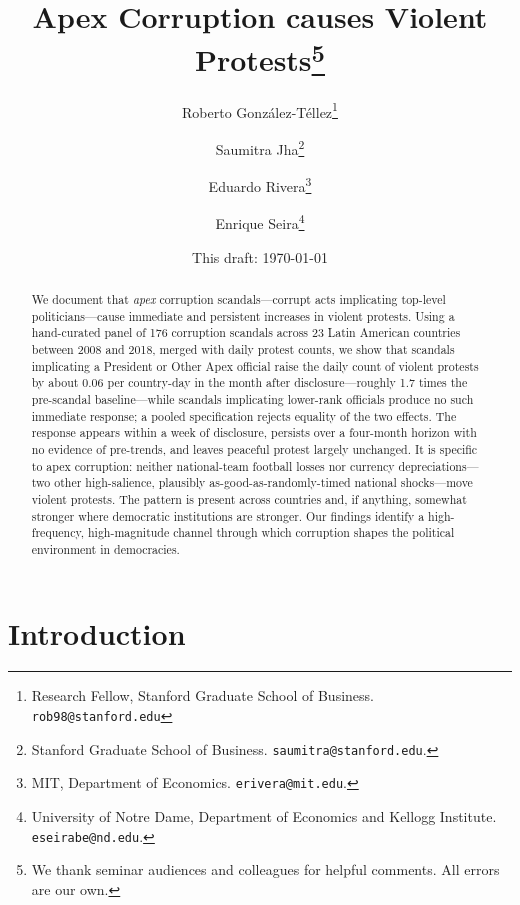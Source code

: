 \documentclass[11pt]{article}
\title{\bfseries\Large Apex Corruption causes Violent Protests\thanks{We thank seminar audiences and colleagues for helpful comments. All errors are our own.}}
\author{%
Roberto Gonz\'alez-T\'ellez\thanks{Research Fellow, Stanford Graduate School of Business. \texttt{rob98@stanford.edu}}  \and Saumitra Jha\thanks{Stanford Graduate School of Business. \texttt{saumitra@stanford.edu}.}
\and
Eduardo Rivera\thanks{MIT, Department of Economics. \texttt{erivera@mit.edu}.} \and
Enrique Seira\thanks{University of Notre Dame, Department of Economics and Kellogg Institute. \texttt{eseirabe@nd.edu}.}
%
}
\date{This draft: \today}
\begin{document}
\maketitle

\begin{abstract}
    \noindent We document that \emph{apex} corruption scandals---corrupt acts implicating top-level politicians---cause immediate and persistent increases in violent protests. Using a hand-curated panel of 176 corruption scandals across 23 Latin American countries between 2008 and 2018, merged with daily protest counts, we show that scandals implicating a President or Other Apex official raise the daily count of violent protests by about 0.06 per country-day in the month after disclosure---roughly 1.7 times the pre-scandal baseline---while scandals implicating lower-rank officials produce no such immediate response; a pooled specification rejects equality of the two effects. The response appears within a week of disclosure, persists over a four-month horizon with no evidence of pre-trends, and leaves peaceful protest largely unchanged. It is specific to apex corruption: neither national-team football losses nor currency depreciations---two other high-salience, plausibly as-good-as-randomly-timed national shocks---move violent protests. The pattern is present across countries and, if anything, somewhat stronger where democratic institutions are stronger. Our findings identify a high-frequency, high-magnitude channel through which corruption shapes the political environment in democracies.
\end{abstract}


\bigskip

\clearpage
\section{Introduction}
\end{document}
